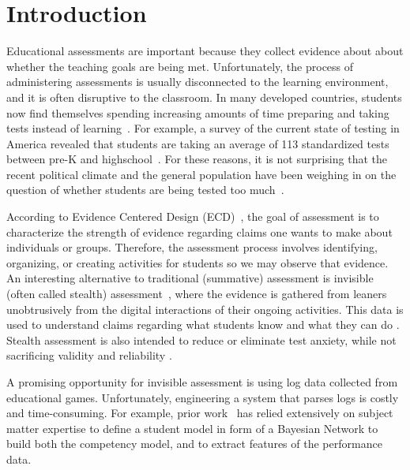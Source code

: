 \documentclass{sigchi}
\newcommand{\hl}[1]{\colorbox{yellow}{#1}}
\begin{document}
\section{Introduction}
Educational assessments are important because they collect evidence about about  whether  the teaching goals are being met.
Unfortunately, the process of  administering assessments is usually disconnected to the learning environment, and  it is often  disruptive to the classroom. 
In many developed countries, students now find themselves spending increasing amounts of time preparing and taking tests instead of learning~\cite{hofman2015rebalancing}.
For example, a  survey of the current state of testing in America revealed that students are taking an average of 113 standardized tests between pre-K and highschool~\cite{lazarin2014testing}.  %
For these reasons, it is not surprising that the recent political climate and the general population have been weighing in on the question of whether students are being tested too much~\cite{lazarin2014testing}.


According to Evidence Centered Design (ECD)~\cite{mislevy2012design}, the goal of assessment is to characterize the strength of evidence regarding claims one wants to make about individuals or groups.
Therefore, the assessment process involves identifying, organizing, or creating activities for students so we may observe that evidence.
An interesting alternative to traditional (summative) assessment is invisible (often called stealth) assessment~\cite{shute2013stealth},
where the evidence is gathered from leaners unobtrusively from the digital interactions of their ongoing activities.
This data is used  to understand claims regarding what students know and what they can do \cite{shute2009melding}.
Stealth assessment is also intended to reduce or eliminate test anxiety, while not sacrificing validity and reliability \cite{shute2008you}.


A promising opportunity for invisible assessment is using log data collected from educational games.
Unfortunately, engineering a system that parses logs is costly and time-consuming.
For example, prior work~\cite{shute2013stealth, shute2009melding} has relied extensively on subject matter expertise to define a student model in form of a  Bayesian Network to build both the competency model, and to extract features of the performance data.
\end{document}
